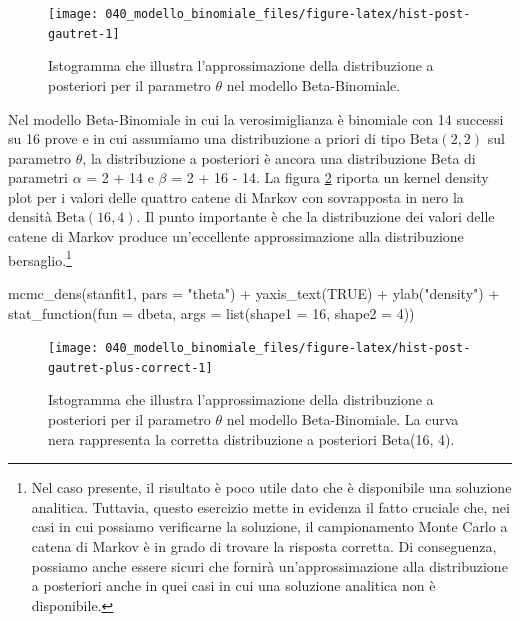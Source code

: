 \documentclass[
  11pt,
  italian,
  a4paper,
  extrafontsizes,onecolumn,openright
  ]{memoir}
\newenvironment{Shaded}{\begin{snugshade}}{\end{snugshade}}
\newcommand{\AttributeTok}[1]{\textcolor[rgb]{0.77,0.63,0.00}{#1}}
\newcommand{\ConstantTok}[1]{\textcolor[rgb]{0.00,0.00,0.00}{#1}}
\newcommand{\DecValTok}[1]{\textcolor[rgb]{0.00,0.00,0.81}{#1}}
\newcommand{\FunctionTok}[1]{\textcolor[rgb]{0.00,0.00,0.00}{#1}}
\newcommand{\NormalTok}[1]{#1}
\newcommand{\SpecialCharTok}[1]{\textcolor[rgb]{0.00,0.00,0.00}{#1}}
\newcommand{\StringTok}[1]{\textcolor[rgb]{0.31,0.60,0.02}{#1}}
\begin{document}
\begin{figure}

{\centering \texttt{[image: 040\_modello\_binomiale\_files/figure-latex/hist-post-gautret-1]} 

}

\caption{Istogramma che illustra l'approssimazione della distribuzione a posteriori per il parametro $\theta$ nel modello Beta-Binomiale.}\label{fig:hist-post-gautret}
\end{figure}

Nel modello Beta-Binomiale in cui la verosimiglianza è binomiale con 14 successi su 16 prove e in cui assumiamo una distribuzione a priori di tipo \(\mbox{Beta}(2, 2)\) sul parametro \(\theta\), la distribuzione a posteriori è ancora una distribuzione Beta di parametri \(\alpha\) = 2 + 14 e \(\beta\) = 2 + 16 - 14. La figura \ref{fig:hist-post-gautret-plus-correct} riporta un kernel density plot per i valori delle quattro catene di Markov con sovrapposta in nero la densità \(\mbox{Beta}(16, 4)\). Il punto importante è che la distribuzione dei valori delle catene di Markov produce un'eccellente approssimazione alla distribuzione bersaglio.\footnote{Nel caso presente, il risultato è poco utile dato che è disponibile una soluzione analitica. Tuttavia, questo esercizio mette in evidenza il fatto cruciale che, nei casi in cui possiamo verificarne la soluzione, il campionamento Monte Carlo a catena di Markov è in grado di trovare la risposta corretta. Di conseguenza, possiamo anche essere sicuri che fornirà un'approssimazione alla distribuzione a posteriori anche in quei casi in cui una soluzione analitica non è disponibile.}

\begin{Shaded}
\begin{Highlighting}[]
\FunctionTok{mcmc\_dens}\NormalTok{(stanfit1, }\AttributeTok{pars =} \StringTok{"theta"}\NormalTok{) }\SpecialCharTok{+}
  \FunctionTok{yaxis\_text}\NormalTok{(}\ConstantTok{TRUE}\NormalTok{) }\SpecialCharTok{+}
  \FunctionTok{ylab}\NormalTok{(}\StringTok{"density"}\NormalTok{) }\SpecialCharTok{+}
  \FunctionTok{stat\_function}\NormalTok{(}\AttributeTok{fun =}\NormalTok{ dbeta, }\AttributeTok{args =} \FunctionTok{list}\NormalTok{(}\AttributeTok{shape1 =} \DecValTok{16}\NormalTok{, }\AttributeTok{shape2 =} \DecValTok{4}\NormalTok{))}
\end{Highlighting}
\end{Shaded}

\begin{figure}

{\centering \texttt{[image: 040\_modello\_binomiale\_files/figure-latex/hist-post-gautret-plus-correct-1]} 

}

\caption{Istogramma che illustra l'approssimazione della distribuzione a posteriori per il parametro $\theta$ nel modello Beta-Binomiale. La curva nera rappresenta la corretta distribuzione a posteriori Beta(16, 4).}\label{fig:hist-post-gautret-plus-correct}
\end{figure}
\end{document}
